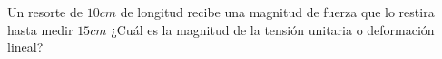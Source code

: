 
\question Un resorte de $10 cm$ de longitud recibe una magnitud de fuerza
          que lo restira hasta medir $15 cm$ ¿Cuál es la magnitud de la
          tensión unitaria o deformación lineal?

